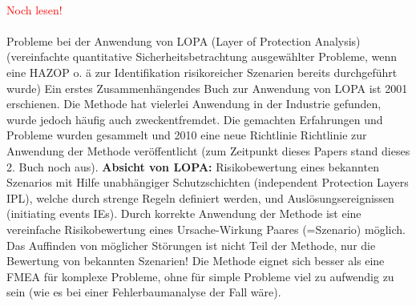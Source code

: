 \paragraph*{\cite{Kockmann_2017}} \textcolor{red}{Noch lesen!}

\paragraph*{\cite{Bridges_2010}} Probleme bei der Anwendung von LOPA (Layer of Protection Analysis) (vereinfachte quantitative Sicherheitsbetrachtung ausgew\"ahlter Probleme, wenn eine HAZOP o. \"a zur Identifikation risikoreicher Szenarien bereits durchgef\"uhrt wurde) \hfill \newline
Ein erstes Zusammenh\"angendes Buch zur Anwendung von LOPA ist 2001 erschienen. Die Methode hat vielerlei Anwendung in der Industrie gefunden, wurde jedoch h\"aufig auch zweckentfremdet. Die gemachten Erfahrungen und Probleme wurden gesammelt und 2010 eine neue Richtlinie Richtlinie zur Anwendung der Methode ver\"offentlicht (zum Zeitpunkt dieses Papers stand dieses 2. Buch noch aus).
\textbf{Absicht von LOPA:} Risikobewertung eines bekannten Szenarios mit Hilfe unabh\"angiger Schutzschichten (independent Protection Layers IPL), welche durch strenge Regeln definiert werden, und Ausl\"osungsereignissen (initiating events IEs). Durch korrekte Anwendung der Methode ist eine vereinfache Risikobewertung eines Ursache-Wirkung Paares (=Szenario) m\"oglich. Das Auffinden von m\"oglicher St\"orungen ist nicht Teil der Methode, nur die Bewertung von bekannten Szenarien! Die Methode eignet sich besser als eine FMEA f\"ur komplexe Probleme, ohne f\"ur simple Probleme viel zu aufwendig zu sein (wie es bei einer Fehlerbaumanalyse der Fall w\"are). 

